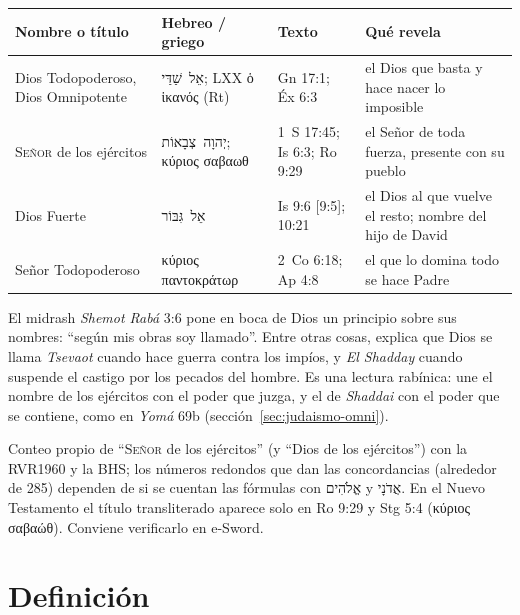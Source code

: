 \documentclass[11pt,letterpaper]{article}
\newcommand{\heb}[1]{\mbox{\foreignlanguage{hebrew}{#1}}}
\newcommand{\grc}[1]{\foreignlanguage{ancientgreek}{#1}}
\newcommand{\SENOR}{\textsc{Señor}}
\begin{document}
\begin{center}\small\renewcommand{\arraystretch}{1.25}
\begin{tabular}{@{}L{3.4cm}L{3.6cm}L{3.0cm}L{4.4cm}@{}}
\toprule
\textbf{Nombre o título} & \textbf{Hebreo / griego} & \textbf{Texto} & \textbf{Qué revela} \\ \midrule
Dios Todopoderoso, Dios Omnipotente & \heb{אֵל שַׁדַּי}; LXX \grc{ὁ ἱκανός} (Rt) & Gn 17:1; Éx 6:3 & el Dios que basta y hace nacer lo imposible \\
\SENOR{} de los ejércitos & \heb{יְהוָה צְבָאוֹת}; \grc{κύριος σαβαωθ} & 1~S 17:45; Is 6:3; Ro 9:29 & el Señor de toda fuerza, presente con su pueblo \\
Dios Fuerte & \heb{אֵל גִּבּוֹר} & Is 9:6 [9:5]; 10:21 & el Dios al que vuelve el resto; nombre del hijo de David \\
Señor Todopoderoso & \grc{κύριος παντοκράτωρ} & 2~Co 6:18; Ap 4:8 & el que lo domina todo se hace Padre \\
\bottomrule
\end{tabular}\end{center}

\begin{nota}[Precisión]
El midrash \emph{Shemot Rabá} 3:6 pone en boca de Dios un principio sobre sus nombres: ``según mis obras soy llamado''. Entre otras cosas, explica que Dios se llama \emph{Tsevaot} cuando hace guerra contra los impíos, y \emph{El Shadday} cuando suspende el castigo por los pecados del hombre. Es una lectura rabínica: une el nombre de los ejércitos con el poder que juzga, y el de \emph{Shaddai} con el poder que se contiene, como en \emph{Yomá} 69b (sección~\ref{sec:judaismo-omni}).
\end{nota}

\begin{nota}[Precisión]
Conteo propio de ``\SENOR{} de los ejércitos'' (y ``Dios de los ejércitos'') con la RVR1960 y la BHS; los números redondos que dan las concordancias (alrededor de 285) dependen de si se cuentan las fórmulas con \heb{אֱלֹהִים} y \heb{אֲדֹנָי}. En el Nuevo Testamento el título transliterado aparece solo en Ro 9:29 y Stg 5:4 (\grc{κύριος σαβαώθ}). Conviene verificarlo en e-Sword.
\end{nota}

\section{Definición}
\end{document}
